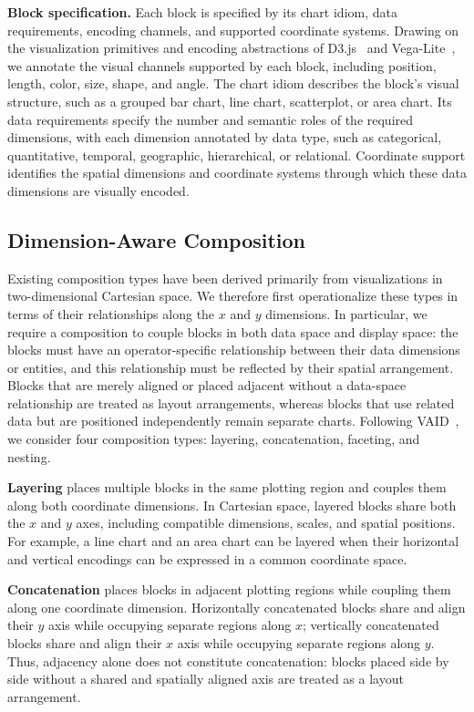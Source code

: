 \textbf{Block specification.}
Each block is specified by its chart idiom, data requirements, encoding
channels, and supported coordinate systems. Drawing on the visualization
primitives and encoding abstractions of D3.js~\cite{bostock2011d3} and
Vega-Lite~\cite{satyanarayan2016vega}, we annotate the visual channels supported by each
block, including position, length, color, size, shape, and angle. The chart
idiom describes the block's visual structure, such as a grouped bar chart,
line chart, scatterplot, or area chart. Its data requirements specify the
number and semantic roles of the required dimensions, with each dimension
annotated by data type, such as categorical, quantitative, temporal,
geographic, hierarchical, or relational. Coordinate support identifies the
spatial dimensions and coordinate systems through which these data dimensions
are visually encoded.



\subsection{Dimension-Aware Composition}
Existing composition types have been derived primarily from visualizations in
two-dimensional Cartesian space. We therefore first operationalize these
types in terms of their relationships along the $x$ and $y$ dimensions. In
particular, we require a composition to couple blocks in both data space and
display space: the blocks must have an operator-specific relationship between
their data dimensions or entities, and this relationship must be reflected by
their spatial arrangement. Blocks that are merely aligned or placed adjacent
without a data-space relationship are treated as layout arrangements, whereas
blocks that use related data but are positioned independently remain separate
charts. Following VAID~\cite{vaid}, we consider four composition types:
layering, concatenation, faceting, and nesting.

\textbf{Layering} places multiple blocks in the same plotting region and couples them
along both coordinate dimensions. In Cartesian space, layered blocks share
both the $x$ and $y$ axes, including compatible dimensions, scales, and spatial
positions. For example, a line chart and an area chart can be layered when
their horizontal and vertical encodings can be expressed in a common
coordinate space.

\textbf{Concatenation} places blocks in adjacent plotting regions while coupling them
along one coordinate dimension. Horizontally concatenated blocks share and
align their $y$ axis while occupying separate regions along $x$; vertically
concatenated blocks share and align their $x$ axis while occupying separate
regions along $y$. Thus, adjacency alone does not constitute concatenation:
blocks placed side by side without a shared and spatially aligned axis are
treated as a layout arrangement.

